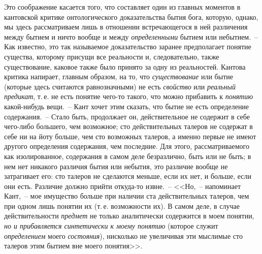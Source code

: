 Это соображение касается того, что составляет один
из главных моментов в кантовской критике онтологического
доказательства бытия бога, которую, однако, мы
здесь рассматриваем лишь в отношении встречающегося
в ней различения между бытием и ничто вообще и между
\emph{определенными} бытием или небытием.~-- Как известно,
это так называемое доказательство заранее предполагает
понятие существа, которому присущи все реальности и,
следовательно, также существование, каковое также было
принято за одну из реальностей. Кантова критика напирает,
главным образом, на то, что \emph{существование} или бытие
(которые здесь считаются равнозначными) не есть
\emph{свойство} или \emph{реальный предикат}, т.\,е. не есть понятие
чего-то такого, что можно прибавить к \emph{понятию} какой-нибудь
вещи\footnotemark{}.~-- Кант хочет этим сказать, что бытие не
есть определение содержания.~-- Стало быть, продолжает
он, действительное не содержит в себе чего-либо большего,
чем возможное; сто действительных талеров не содержат
в себе ни на йоту больше, чем сто возможных
талеров, а именно первые не имеют другого определения
содержания, чем последние. Для этого, рассматриваемого
как изолированное, содержания в самом деле
безразлично, быть или не быть; в нем нет никакого различия
бытия или небытия, это различие вообще не затрагивает
его: сто талеров не сделаются меньше, если их
нет, и больше, если они есть. Различие должно прийти
откуда-то извне.~-- <<Но,~-- напоминает Кант,~-- мое имущество
больше при наличии ста действительных талеров,
чем при одном лишь понятии их (т.\,е. возможности их).
В самом деле, в случае действительности \emph{предмет} не
только аналитически содержится в моем понятии, \emph{но и
прибавляется синтетически к моему понятию} (которое
служит \emph{определением} моего \emph{состояния}), нисколько не увеличивая
эти мыслимые сто талеров этим бытием вне
моего понятия>>\endnotemark{}.




